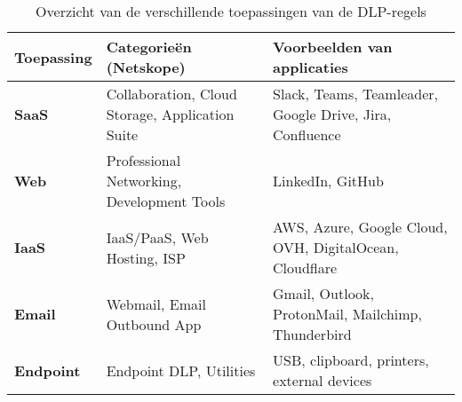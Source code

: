 \begin{table}[h]
    \centering
    \small
    \begin{tabular}{lll}
        \toprule
        \textbf{Toepassing} & \textbf{Categorieën (Netskope)} & \textbf{Voorbeelden van applicaties} \\
        \midrule
        \textbf{SaaS}     & Collaboration, Cloud Storage, Application Suite & Slack, Teams, Teamleader, Google Drive, Jira, Confluence \\
        \textbf{Web}      & Professional Networking, Development Tools & LinkedIn, GitHub \\
        \textbf{IaaS}     & IaaS/PaaS, Web Hosting, ISP & AWS, Azure, Google Cloud, OVH, DigitalOcean, Cloudflare \\
        \textbf{Email}    & Webmail, Email Outbound App & Gmail, Outlook, ProtonMail, Mailchimp, Thunderbird \\
        \textbf{Endpoint} & Endpoint DLP, Utilities & USB, clipboard, printers, external devices \\
        \bottomrule
    \end{tabular}
    \caption{Overzicht van de verschillende toepassingen van de DLP-regels}
    \label{tab:toepassingen}
\end{table}



\subsection{}
\label{subsubsec:saas-poc}


